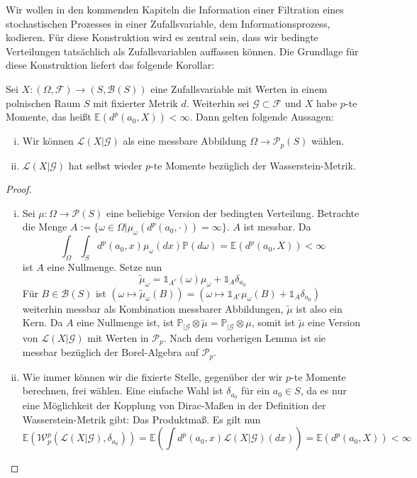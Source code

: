 Wir wollen in den kommenden Kapiteln die Information einer Filtration eines stochastischen Prozesses in einer Zufallsvariable, dem Informationsprozess, kodieren. Für diese Konstruktion wird es zentral sein, dass wir bedingte Verteilungen tatsächlich als Zufallsvariablen auffassen können. Die Grundlage für diese Konstruktion liefert das folgende Korollar:
\begin{corollary}\label{thm:pmoments}
    Sei $X:(\Omega, \mathcal{F})\rightarrow(S, \mathcal{B}(S))$ eine Zufallsvariable mit Werten in einem polnischen Raum $S$ mit fixierter Metrik $d$. Weiterhin sei $\mathcal{G}\subset \mathcal{F}$ und $X$ habe $p$-te Momente, das heißt $\mathbb{E}(d^p(a_0, X))<\infty$. Dann gelten folgende Aussagen:
    \begin{enumerate}[(i)]
        \item Wir können $\mathcal{L}(X\vert \mathcal{G})$ als eine messbare Abbildung $\Omega\rightarrow\mathcal{P}_p(S)$ wählen.
        \item $\mathcal{L}(X\vert \mathcal{G})$ hat selbst wieder $p$-te Momente bezüglich der Wasserstein-Metrik.
    \end{enumerate}
\end{corollary}
\begin{proof}
\begin{enumerate}[(i)]
    \item Sei $\mu:\Omega\rightarrow\mathcal{P}(S)$ eine beliebige Version der bedingten Verteilung. Betrachte die Menge $A:=\{\omega\in\Omega\vert \mu_\omega(d^p(a_0, \cdot)) = \infty\}$. $A$ ist messbar. Da 
$$\int_{\Omega}\int_{S} d^p(a_0, x)\mu_{\omega}(dx)\mathbb{P}(d\omega) = \mathbb{E}(d^p(a_0, X))<\infty$$
ist $A$ eine Nullmenge. Setze nun 
$$\tilde{\mu}_\omega=\mathds{1}_{A^c}(\omega)\mu_\omega + \mathds{1}_{A}\delta_{a_0}$$
Für $B\in\mathcal{B}(S)$ ist $(\omega\mapsto\tilde{\mu}_\omega(B)) = (\omega \mapsto \mathds{1}_{A^c}\mu_\omega(B)+\mathds{1}_A \delta_{a_0})$ weiterhin messbar als Kombination messbarer Abbildungen, $\tilde{\mu}$ ist also ein Kern. Da $A$ eine Nullmenge ist, ist $\mathbb{P}_{\vert \mathcal{G}}\otimes \tilde{\mu} = \mathbb{P}_{\vert\mathcal{G}} \otimes \mu$, somit ist $\tilde{\mu}$ eine Version von $\mathcal{L}(X\vert \mathcal{G})$ mit Werten in $\mathcal{P}_p$. Nach dem vorherigen Lemma ist sie messbar bezüglich der Borel-Algebra auf $\mathcal{P}_p$.
\item Wie immer können wir die fixierte Stelle, gegenüber der wir $p$-te Momente berechnen, frei wählen. Eine einfache Wahl ist $\delta_{a_0}$ für ein $a_0\in S$, da es nur eine Möglichkeit der Kopplung von Dirac-Maßen in der Definition der Wasserstein-Metrik gibt: Das Produktmaß. Es gilt nun
$$\mathbb{E}\left(\mathcal{W}_p^p\left(\mathcal{L}(X\vert\mathcal{G}), \delta_{a_0}\right)\right)=\mathbb{E}\left(\int d^p(a_0, x)\mathcal{L}(X\vert\mathcal{G})(dx)\right)=\mathbb{E}\left(d^p(a_0, X)\right) < \infty$$
\end{enumerate}
\end{proof}
